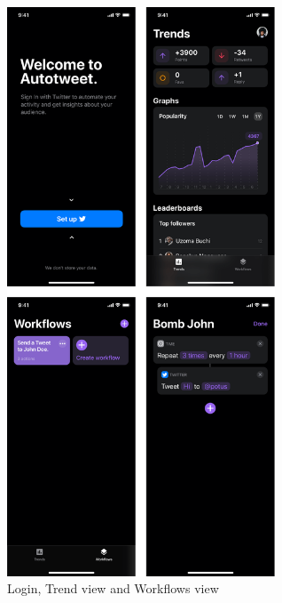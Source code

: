 \documentclass{report}
\begin{document}
\begin{figure}[htp]
    \centering
    \includegraphics[width=8cm]{gui}
    \caption{Login, Trend view and Workflows view}
    \label{fig:gui}
\end{figure}
\end{document}
